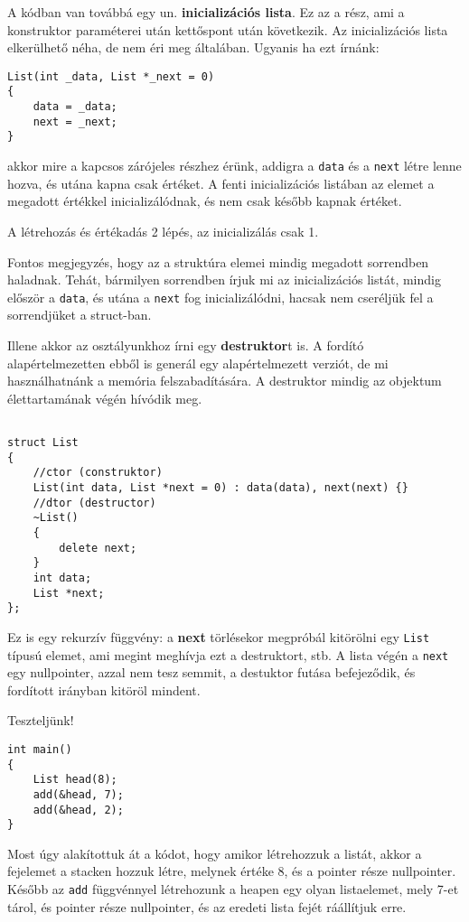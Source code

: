 \documentclass[a4paper,11.5pt]{article}
\begin{document}
	\medskip
	A kódban van továbbá egy un. \textbf{inicializációs lista}. Ez az a rész, ami a konstruktor paraméterei után kettőspont után következik. Az inicializációs lista elkerülhető néha, de nem éri meg általában. Ugyanis ha ezt írnánk:
	\begin{lstlisting}
List(int _data, List *_next = 0)
{
	data = _data;
	next = _next;
}
	\end{lstlisting}
	akkor mire a kapcsos zárójeles részhez érünk, addigra a \texttt{data} és a \texttt{next} létre lenne hozva, és utána kapna csak értéket. A fenti inicializációs listában az elemet a megadott értékkel inicializálódnak, és nem csak később kapnak értéket.
	\begin{note}
		A létrehozás és értékadás 2 lépés, az inicializálás csak 1.
	\end{note}
	Fontos megjegyzés, hogy az a struktúra elemei mindig megadott sorrendben haladnak. Tehát, bármilyen sorrendben írjuk mi az inicializációs listát, mindig először a \texttt{data}, és utána a \texttt{next} fog inicializálódni, hacsak nem cseréljük fel a sorrendjüket a struct-ban.
	
	\medskip
	Illene akkor az osztályunkhoz írni egy \textbf{destruktor}t is.  A fordító alapértelmezetten ebből is generál egy alapértelmezett verziót, de mi használhatnánk a memória felszabadítására. A destruktor mindig az objektum élettartamának végén hívódik meg.
	\begin{lstlisting}

struct List
{
	//ctor (construktor)
	List(int data, List *next = 0) : data(data), next(next) {}
	//dtor (destructor)
	~List()
	{
		delete next;
	}
	int data;
	List *next;
};
	\end{lstlisting}
	Ez is egy rekurzív függvény: a \textbf{next} törlésekor megpróbál kitörölni egy \texttt{List} típusú elemet, ami megint meghívja ezt a destruktort, stb. A lista végén a \texttt{next} egy nullpointer, azzal nem tesz semmit, a destuktor futása befejeződik, és fordított irányban kitöröl mindent.
	
	\medskip
	Teszteljünk!
	\begin{lstlisting}
int main()
{
	List head(8);
	add(&head, 7);
	add(&head, 2);
}
	\end{lstlisting}
	Most úgy alakítottuk át a kódot, hogy amikor létrehozzuk a listát, akkor a fejelemet a stacken hozzuk létre, melynek értéke 8, és a pointer része nullpointer. Később az \texttt{add} függvénnyel létrehozunk a heapen egy olyan listaelemet, mely 7-et tárol, és pointer része nullpointer, és az eredeti lista fejét ráállítjuk erre.
	
\end{document}

